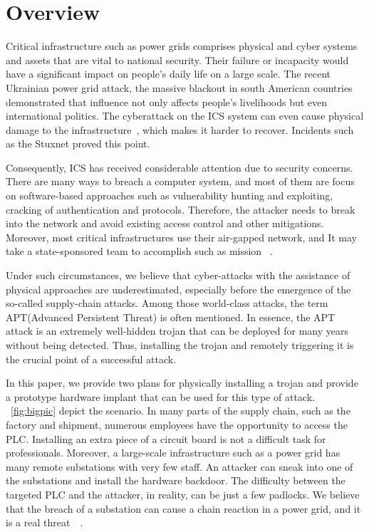 \section{Overview}
\label{sec:implant-overview}


Critical infrastructure such as power grids comprises physical and cyber systems and assets that are vital to national security. Their failure or incapacity would have a significant impact on people's daily life on a large scale. The recent Ukrainian power grid attack, the massive blackout in south American countries~\cite{haes2019survey} demonstrated that influence not only affects people's livelihoods but even international politics. The cyberattack on the ICS system can even cause physical damage to the infrastructure~\cite{zeller2011myth}, which makes it harder to recover. Incidents such as the Stuxnet proved this point.

Consequently, ICS has received considerable attention due to security concerns. There are many ways to breach a computer system, and most of them are focus on software-based approaches such as vulnerability hunting and exploiting, cracking of authentication and protocols. Therefore, the attacker needs to break into the network and avoid existing access control and other mitigations. Moreover, most critical infrastructures use their air-gapped network, and It may take a state-sponsored team to accomplish such as mission ~\cite{langner2011stuxnet}. 

Under such circumstances, we believe that cyber-attacks with the assistance of physical approaches are underestimated, especially before the emergence of the so-called supply-chain attacks. Among those world-class attacks, the term APT(Advanced Persistent Threat) is often mentioned. In essence, the APT attack is an extremely well-hidden trojan that can be deployed for many years without being detected. Thus, installing the trojan and remotely triggering it is the crucial point of a successful attack.

In this paper, we provide two plans for physically installing a trojan and provide a prototype hardware implant \name that can be used for this type of attack. ~\autoref{fig:bigpic} depict the scenario. In many parts of the supply chain, such as the factory and shipment, numerous employees have the opportunity to access the PLC. Installing an extra piece of a circuit board is not a difficult task for professionals. Moreover, a large-scale infrastructure such as a power grid has many remote substations with very few staff. An attacker can sneak into one of the substations and install the hardware backdoor. The difficulty between the targeted PLC and the attacker, in reality, can be just a few padlocks. We believe that the breach of a substation can cause a chain reaction in a power grid, and it is a real threat~\cite{substationattack}~\cite{chen2020study}.



